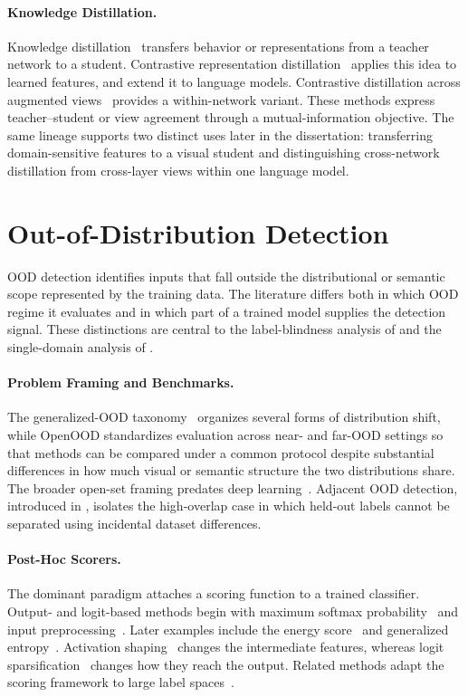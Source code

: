 \paragraph{Knowledge Distillation.}
Knowledge distillation~\citep{hinton2015distilling} transfers behavior or
representations from a teacher network to a student. Contrastive representation
distillation~\citep{tian2020crd} applies this idea to learned features, and
\citet{sun2020codir} extend it to language models. Contrastive distillation across
augmented views~\citep{zhang2022cds} provides a within-network variant. These
methods express teacher--student or view agreement through a mutual-information
objective. The same lineage supports two distinct uses later in the dissertation:
transferring domain-sensitive features to a visual student and distinguishing
cross-network distillation from cross-layer views within one language model.

\section{Out-of-Distribution Detection}
\label{sec:lit:ood}

OOD detection identifies inputs that fall outside the distributional or semantic
scope represented by the training data. The literature differs both in which OOD
regime it evaluates and in which part of a trained model supplies the detection
signal. These distinctions are central to the label-blindness analysis of
 and the single-domain analysis of
.

\paragraph{Problem Framing and Benchmarks.}
The generalized-OOD taxonomy~\citep{yang2021generalized} organizes several forms of
distribution shift, while OpenOOD
\citep{yang2022openood,zhang2023openood} standardizes evaluation across near- and
far-OOD settings so that methods can be compared under a common protocol despite
substantial differences in how much visual or semantic structure the two
distributions share. The broader open-set framing predates deep
learning~\citep{drummond2006open}. Adjacent OOD detection, introduced in
, isolates the high-overlap case in which held-out labels
cannot be separated using incidental dataset differences.

\paragraph{Post-Hoc Scorers.}
The dominant paradigm attaches a scoring function to a trained classifier. Output-
and logit-based methods begin with maximum softmax
probability~\citep{hendrycks2016baseline} and input
preprocessing~\citep{liang2017enhancing}. Later examples include the energy
score~\citep{liu2020energy} and generalized entropy~\citep{liu2023gen}.
Activation shaping~\citep{sun2021react,xuscaling} changes the intermediate
features, whereas logit sparsification~\citep{Sun2022dice} changes how they reach
the output. Related methods adapt the scoring framework to large label
spaces~\citep{huang2021mos}.

